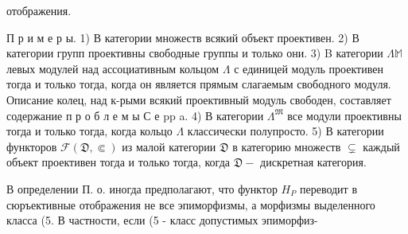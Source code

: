\documentclass[10pt]{article}
\begin{document}
отображения.



П р и м е р ы. 1) В категории множеств всякий объект проективен. 2) В категории групп проективны свободные группы и только они. 3) B категории $\Lambda \mathbb{M}$ левых модулей над ассоциативным кольцом $\Lambda$ с единицей модуль проективен тогда и только тогда, когда он является прямым слагаемым свободного модуля. Описание колец, над к-рыми всякий проективный модуль свободен, составляет содержание п р о б л е м ы С е pp a. 4) В категории $\Lambda^{\mathfrak{M}}$ все модули проективны тогда и только тогда, когда кольцо $\Lambda$ классически полупросто. 5) В категории функторов $\mathscr{F}(\mathfrak{D}, \Subset)$ из малой категории $\mathfrak{D}$ в категорию множеств $\subsetneq$ каждый объект проективен тогда и только тогда, когда $\mathfrak{D}-$ дискретная категория.



В определении П. о. иногда предполагают, что функтор $H_{P}$ переводит в сюръективные отображения не все эпиморфизмы, а морфизмы выделенного класса (5. В частности, если (5 - класс допустимых эпиморфиз-
\end{document}
